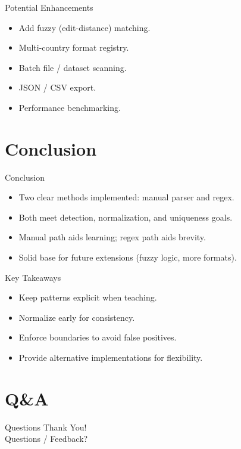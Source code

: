 \documentclass[aspectratio=169]{beamer}
\begin{document}
\begin{frame}{Potential Enhancements}
  \begin{itemize}
    \item Add fuzzy (edit-distance) matching.
    \item Multi-country format registry.
    \item Batch file / dataset scanning.
    \item JSON / CSV export.
    \item Performance benchmarking.
  \end{itemize}
\end{frame}

\section{Conclusion}

\begin{frame}{Conclusion}
  \begin{itemize}
    \item Two clear methods implemented: manual parser and regex.
    \item Both meet detection, normalization, and uniqueness goals.
    \item Manual path aids learning; regex path aids brevity.
    \item Solid base for future extensions (fuzzy logic, more formats).
  \end{itemize}
\end{frame}

\begin{frame}{Key Takeaways}
  \begin{itemize}
    \item Keep patterns explicit when teaching.
    \item Normalize early for consistency.
    \item Enforce boundaries to avoid false positives.
    \item Provide alternative implementations for flexibility.
  \end{itemize}
\end{frame}

\section*{Q&A}

\begin{frame}{Questions}
  \centering \Huge Thank You!\\[1em]
  \large Questions / Feedback?
\end{frame}
\end{document}
